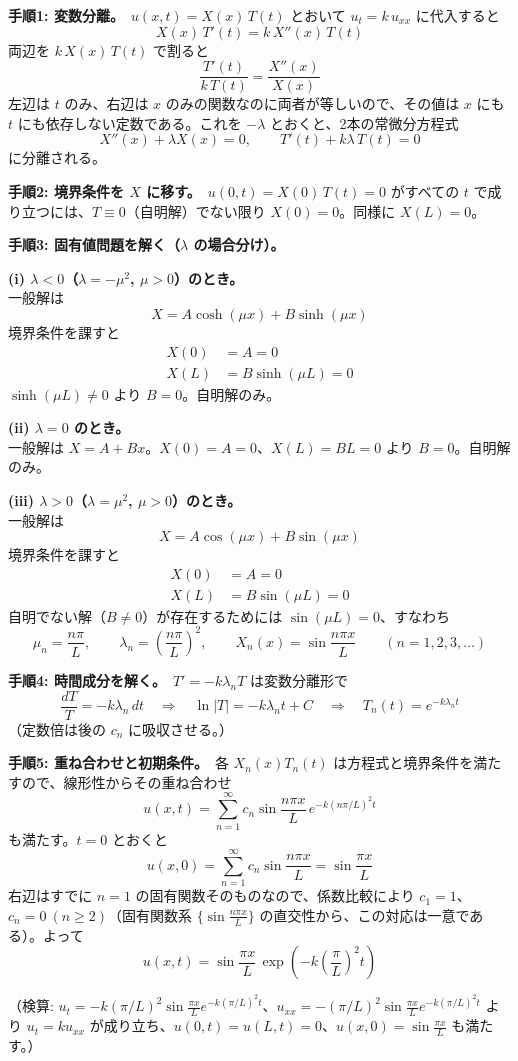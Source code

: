 
\textbf{手順1: 変数分離。}\ $u(x,t) = X(x)\,T(t)$ とおいて $u_t = k\,u_{xx}$ に代入すると
\[
X(x)\,T'(t) = k\,X''(x)\,T(t)
\]
両辺を $k\,X(x)\,T(t)$ で割ると
\[
\frac{T'(t)}{k\,T(t)} = \frac{X''(x)}{X(x)}
\]
左辺は $t$ のみ、右辺は $x$ のみの関数なのに両者が等しいので、その値は $x$ にも $t$ にも依存しない定数である。これを $-\lambda$ とおくと、2本の常微分方程式
\[
X''(x) + \lambda X(x) = 0, \qquad T'(t) + k\lambda\,T(t) = 0
\]
に分離される。

\textbf{手順2: 境界条件を $X$ に移す。}\ $u(0,t) = X(0)\,T(t) = 0$ がすべての $t$ で成り立つには、$T \equiv 0$（自明解）でない限り $X(0) = 0$。同様に $X(L) = 0$。

\textbf{手順3: 固有値問題を解く（$\lambda$ の場合分け）。}

\textbf{(i) $\lambda < 0$（$\lambda = -\mu^{2}$, $\mu>0$）のとき。}\\
一般解は
\[
X = A\cosh(\mu x) + B\sinh(\mu x)
\]
境界条件を課すと
\begin{align*}
X(0) &= A = 0 \\
X(L) &= B\sinh(\mu L) = 0
\end{align*}
$\sinh(\mu L) \neq 0$ より $B = 0$。自明解のみ。

\textbf{(ii) $\lambda = 0$ のとき。}\\
一般解は $X = A + Bx$。$X(0) = A = 0$、$X(L) = BL = 0$ より $B = 0$。自明解のみ。

\textbf{(iii) $\lambda > 0$（$\lambda = \mu^{2}$, $\mu>0$）のとき。}\\
一般解は
\[
X = A\cos(\mu x) + B\sin(\mu x)
\]
境界条件を課すと
\begin{align*}
X(0) &= A = 0 \\
X(L) &= B\sin(\mu L) = 0
\end{align*}
自明でない解（$B \neq 0$）が存在するためには $\sin(\mu L) = 0$、すなわち
\[
\mu_n = \frac{n\pi}{L}, \qquad \lambda_n = \left(\frac{n\pi}{L}\right)^{2}, \qquad X_n(x) = \sin\frac{n\pi x}{L} \qquad (n = 1, 2, 3, \dots)
\]

\textbf{手順4: 時間成分を解く。}\ $T' = -k\lambda_n T$ は変数分離形で
\[
\frac{dT}{T} = -k\lambda_n\,dt
\quad\Longrightarrow\quad
\ln|T| = -k\lambda_n t + C
\quad\Longrightarrow\quad
T_n(t) = e^{-k\lambda_n t}
\]
（定数倍は後の $c_n$ に吸収させる。）

\textbf{手順5: 重ね合わせと初期条件。}\ 各 $X_n(x)T_n(t)$ は方程式と境界条件を満たすので、線形性からその重ね合わせ
\[
u(x,t) = \sum_{n=1}^{\infty} c_n \sin\frac{n\pi x}{L}\,e^{-k(n\pi/L)^2 t}
\]
も満たす。$t=0$ とおくと
\[
u(x,0) = \sum_{n=1}^{\infty} c_n \sin\frac{n\pi x}{L} = \sin\frac{\pi x}{L}
\]
右辺はすでに $n=1$ の固有関数そのものなので、係数比較により $c_1 = 1$、$c_n = 0\ (n \ge 2)$（固有関数系 $\{\sin\frac{n\pi x}{L}\}$ の直交性から、この対応は一意である）。よって
\[
\boxed{\; u(x,t) = \sin\frac{\pi x}{L}\,\exp\!\left(-k\left(\frac{\pi}{L}\right)^{2} t\right) \;}
\]

（検算: $u_t = -k(\pi/L)^2 \sin\frac{\pi x}{L}e^{-k(\pi/L)^2t}$、$u_{xx} = -(\pi/L)^2\sin\frac{\pi x}{L}e^{-k(\pi/L)^2t}$ より $u_t = k u_{xx}$ が成り立ち、$u(0,t)=u(L,t)=0$、$u(x,0)=\sin\frac{\pi x}{L}$ も満たす。）
